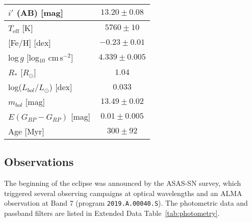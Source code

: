 \documentclass[sn-nature]{sn-jnl}%
\newcommand{\teff}{$T_\mathrm{eff}$}
\newcommand{\rsun}{$R_\odot$}
\begin{document}
\begin{table}
\begin{tabular}{@{}lc@{}}
         $i'$ (AB) {[}mag{]}                     & $13.20\pm0.08$\footnotemark[4]   \\
        \hline
         \teff{} [K]                            & $5760\pm10$\footnotemark[1]  \\
         {[}Fe/H{]} [dex]                       & $-0.23\pm0.01$\footnotemark[1] \\
         log\,$g$ [log$_{10}$ cm\,s$^{-2}$]     & $4.339\pm0.005$\footnotemark[1]  \\
         $R_*$ [\rsun{}]                        & $1.04$\footnotemark[5] \\
         log($L_{bol}/L_{\odot}$) [dex]         & $0.033$\footnotemark[5] \\
         $m_{bol}$ [mag]                        & $13.49\pm0.02$\footnotemark[6] \\
         $E(G_{BP}-G_{RP})$ {[}mag{]}           & $0.01 \pm 0.005$\footnotemark[6]    \\
         Age [Myr]                              & $300\pm92$\footnotemark[7] \\
         
        \hline
    \end{tabular}

\label{tab:Stellarprop}
\end{table}

\subsection*{Observations}\label{sec:obs}

The beginning of the eclipse was announced \cite{RizzoSmith21} by the ASAS-SN survey, which triggered several observing campaigns at optical wavelengths and an ALMA observation at Band 7 (program \texttt{2019.A.00040.S}).
%
The photometric data and passband filters are listed in Extended Data Table~\ref{tab:photometry}.
%
\end{document}
